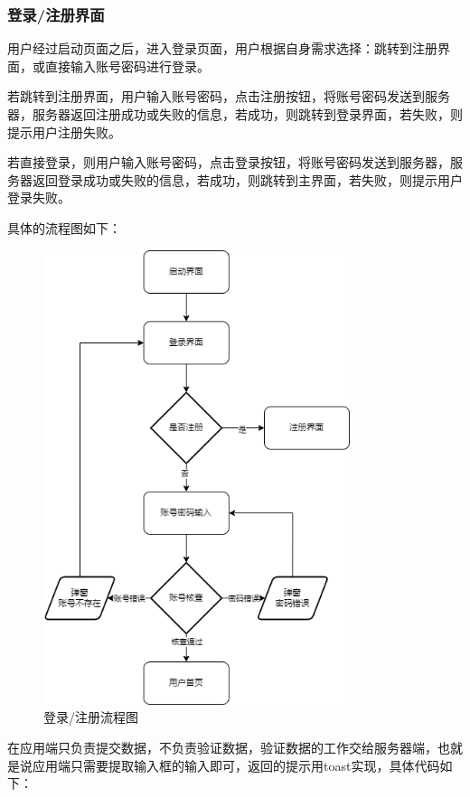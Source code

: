 \documentclass[UTF8,12pt]{article}
\begin{document}
\subsubsection{登录/注册界面}
用户经过启动页面之后，进入登录页面，用户根据自身需求选择：跳转到注册界面，或直接输入账号密码进行登录。

若跳转到注册界面，用户输入账号密码，点击注册按钮，将账号密码发送到服务器，服务器返回注册成功或失败的信息，若成功，则跳转到登录界面，若失败，则提示用户注册失败。

若直接登录，则用户输入账号密码，点击登录按钮，将账号密码发送到服务器，服务器返回登录成功或失败的信息，若成功，则跳转到主界面，若失败，则提示用户登录失败。

具体的流程图如下：

\begin{figure}[htbp]
    \centering
    \includegraphics[width=0.8\textwidth]{imgs/1.png}
    \caption{登录/注册流程图}
\end{figure}

\newpage

在应用端只负责提交数据，不负责验证数据，验证数据的工作交给服务器端，也就是说应用端只需要提取输入框的输入即可，返回的提示用toast实现，具体代码如下：
\end{document}
